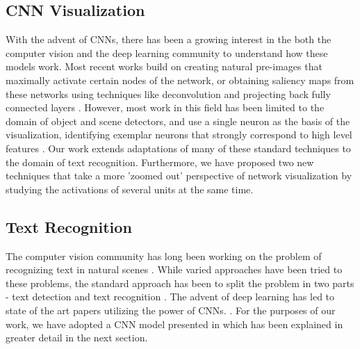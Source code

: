 \documentclass[10pt,twocolumn,letterpaper]{article}
\begin{document}
\subsection{CNN Visualization}
With the advent of CNNs, there has been a growing interest in the both the computer vision and the deep learning community to understand how these models work. Most recent works build on creating natural pre-images \cite{DBLP:journals/corr/MahendranV15} that maximally activate certain nodes of the network, or obtaining saliency maps from these networks using techniques like deconvolution \cite{DBLP:journals/corr/ZeilerF13} and
projecting back fully connected layers \cite{DBLP:journals/corr/SimonyanVZ13}. However, most work in this field has been limited to the domain of object and scene detectors, and use a single neuron as the basis of the visualization, identifying exemplar neurons that strongly correspond to high level features \cite{zhou2014object,DBLP:journals/corr/GirshickDDM13,DBLP:journals/corr/MahendranV15,DBLP:journals/corr/ZeilerF13,DBLP:journals/corr/SimonyanVZ13,mahendran2015understanding}. Our work extends adaptations of many of these standard techniques \cite{yosinski2015understanding} to the domain of text recognition. Furthermore, we have proposed two new techniques that take a more 'zoomed out' perspective of network visualization by studying the activations of several units at the same time.


\subsection{Text Recognition}


The computer vision community has long been working on the problem of recognizing text in natural scenes \cite{1315187}. While varied approaches have been tried to these problems, the standard approach has been to split the problem in two parts - text detection and text recognition \cite{PosnerEtAl-IROS2010,Neumann:2011:TLR:2066306.2067476,Yang:2014:FIV:2583855.2583972,6751121,KaiWang:2011:EST:2355573.2356398,Weinman:2014:TIS:2574225.2574484,DBLP:journals/corr/AlsharifP13,6751207}. The advent of deep learning has led to state of the art papers utilizing the power of CNNs. \cite{Jaderberg14,Jaderberg14d,Gupta16,6460871}. For the purposes of our work, we have adopted a CNN model presented in \cite{Jaderberg14c} which has been explained in greater detail in the next section.
\end{document}
